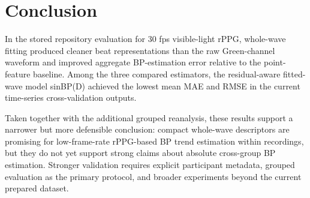 \documentclass[twocolumn]{svjour3}
\begin{document}
\section{Conclusion}
In the stored repository evaluation for 30 fps visible-light rPPG, whole-wave fitting produced cleaner beat representations than the raw Green-channel waveform and improved aggregate BP-estimation error relative to the point-feature baseline. Among the three compared estimators, the residual-aware fitted-wave model sinBP(D) achieved the lowest mean MAE and RMSE in the current time-series cross-validation outputs.

Taken together with the additional grouped reanalysis, these results support a narrower but more defensible conclusion: compact whole-wave descriptors are promising for low-frame-rate rPPG-based BP trend estimation within recordings, but they do not yet support strong claims about absolute cross-group BP estimation. Stronger validation requires explicit participant metadata, grouped evaluation as the primary protocol, and broader experiments beyond the current prepared dataset.



\end{document}
